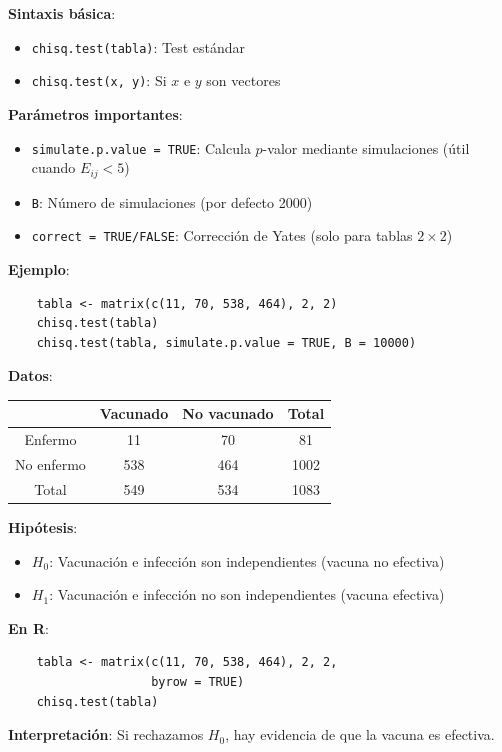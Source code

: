 \documentclass[10pt,a4paper]{article}
\begin{document}
\begin{tcolorbox}[title=chisq.test: Parámetros Avanzados]
    \textbf{Sintaxis básica}:
    \begin{itemize}
        \item \texttt{chisq.test(tabla)}: Test estándar
        \item \texttt{chisq.test(x, y)}: Si $x$ e $y$ son vectores
    \end{itemize}
    
    \textbf{Parámetros importantes}:
    \begin{itemize}
        \item \texttt{simulate.p.value = TRUE}: Calcula $p$-valor mediante simulaciones (útil cuando $E_{ij} < 5$)
        \item \texttt{B}: Número de simulaciones (por defecto 2000)
        \item \texttt{correct = TRUE/FALSE}: Corrección de Yates (solo para tablas $2 \times 2$)
    \end{itemize}
    
    \textbf{Ejemplo}:
    \begin{verbatim}
    tabla <- matrix(c(11, 70, 538, 464), 2, 2)
    chisq.test(tabla)
    chisq.test(tabla, simulate.p.value = TRUE, B = 10000)
    \end{verbatim}
\end{tcolorbox}

\begin{tcolorbox}[title=Ejemplo: Vacuna de Hepatitis]
    \textbf{Datos}:
    \begin{center}
    \begin{tabular}{|c|c|c|c|}
    \hline
    & Vacunado & No vacunado & Total \\
    \hline
    Enfermo & 11 & 70 & 81 \\
    No enfermo & 538 & 464 & 1002 \\
    \hline
    Total & 549 & 534 & 1083 \\
    \hline
    \end{tabular}
    \end{center}
    
    \textbf{Hipótesis}:
    \begin{itemize}
        \item $H_0$: Vacunación e infección son independientes (vacuna no efectiva)
        \item $H_1$: Vacunación e infección no son independientes (vacuna efectiva)
    \end{itemize}
    
    \textbf{En R}:
    \begin{verbatim}
    tabla <- matrix(c(11, 70, 538, 464), 2, 2, 
                    byrow = TRUE)
    chisq.test(tabla)
    \end{verbatim}
    
    \textbf{Interpretación}: Si rechazamos $H_0$, hay evidencia de que la vacuna es efectiva.
\end{tcolorbox}
\end{document}
